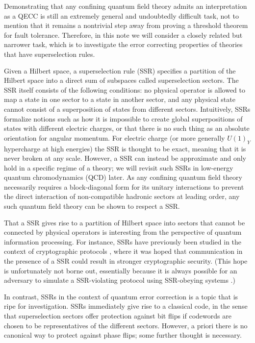 \documentclass[11pt,english]{article}
\begin{document}
Demonstrating that any confining quantum field theory admits an interpretation as a QECC is still an extremely general and undoubtedly difficult task, not to mention that it remains a nontrivial step away from proving a threshold theorem for fault tolerance.
Therefore, in this note we will consider a closely related but narrower task, which is to investigate the error correcting properties of theories that have superselection rules.

Given a Hilbert space, a superselection rule (SSR) specifies a partition of the Hilbert space into a direct sum of subspaces called superselection sectors.
The SSR itself consists of the following conditions: no physical operator is allowed to map a state in one sector to a state in another sector, and any physical state cannot consist of a superposition of states from different sectors.
Intuitively, SSRs formalize notions such as how it is impossible to create global superpositions of states with different electric charges, or that there is no such thing as an absolute orientation for angular momentum.
For electric charge (or more generally $U(1)_Y$ hypercharge at high energies) the SSR is thought to be exact, meaning that it is never broken at any scale.
However, a SSR can instead be approximate and only hold in a specific regime of a theory; we will revisit such SSRs in low-energy quantum chromodynamics (QCD) later. 
As any confining quantum field theory necessarily requires a block-diagonal form for its unitary interactions to prevent the direct interaction of non-compatible hadronic sectors at leading order, any such quantum field theory can be shown to respect a SSR.

That a SSR gives rise to a partition of Hilbert space into sectors that cannot be connected by physical operators is interesting from the perspective of quantum information processing.
For instance, SSRs have previously been studied in the context of cryptographic protocols \cite{mayers2002superselection,verstraete2003quantum,Kitaev:2003zj}, where it was hoped that communication in the presence of a SSR could result in stronger cryptographic security. (This hope is unfortunately not borne out, essentially because it is always possible for an adversary to simulate a SSR-violating protocol using SSR-obeying systems \cite{Kitaev:2003zj,Aharonov:1967zza,bartlett2003entanglement}.)

In contrast, SSRs in the context of quantum error correction is a topic that is ripe for investigation.
SSRs immediately give rise to a classical code, in the sense that superselection sectors offer protection against bit flips if codewords are chosen to be representatives of the different sectors.
However, a priori there is no canonical way to protect against phase flips; some further thought is necessary.
\end{document}

